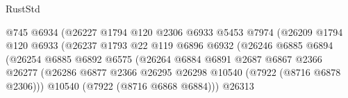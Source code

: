 \begin{lexlean}{RustStd}
\begin{coremodule}
                                              @745
                                              @6934
                                              (@26227
                                                @1794
                                                @120
                                                @2306
                                                @6933
                                                @5453
                                                @7974
                                                (@26209
                                                  @1794
                                                  @120
                                                  @6933
                                                  (@26237
                                                    @1793
                                                    @22
                                                    @119
                                                    @6896
                                                    @6932
                                                    (@26246
                                                      @6885
                                                      @6894
                                                      (@26254
                                                        @6885
                                                        @6892
                                                        @6575
                                                        (@26264
                                                          @6884
                                                          @6891
                                                          @2687
                                                          @6867
                                                          @2366
                                                          @26277
                                                          (@26286
                                                            @6877
                                                            @2366
                                                            @26295
                                                            @26298
                                                            @10540
                                                            (@7922 (@8716 @6878 @2306)))
                                                          @10540
                                                          (@7922 (@8716 @6868 @6884)))
                                                        @26313

\end{coremodule}
\end{lexlean}

